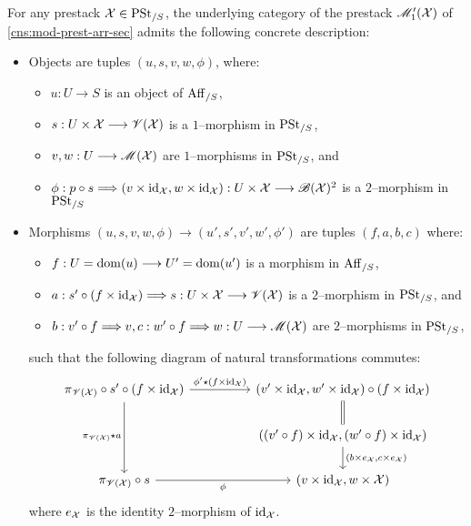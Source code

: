 \documentclass[11pt]{amsart}
\begin{document}
\begin{prop}\label{prop:M1'-concrete}
For any prestack $\mathcal{X} \in \mathrm{PSt}_{/S}$, the underlying category
of the prestack $\mathscr{M}_1'(\mathcal{X})$ of \cref{cns:mod-prest-arr-sec} admits the
following concrete description:
\begin{itemize}
\item Objects are tuples $(u, s, v, w, \phi)$, where:
  \begin{itemize}
  \item $u : U \to S$ is an object of $\mathrm{Aff}_{/S}$,
  \item $s : U \times \mcX \to \sV(\mcX)$ is a $1$--morphism in $\mathrm{PSt}_{/S}$,
  \item $v, w : U \to \sM(\mcX)$ are $1$--morphisms in $\mathrm{PSt}_{/S}$, and
  \item $\phi : p \circ s \To (v \times \id_\mcX, w \times \id_\mcX) :
    U \times \mcX \to \sB(\mcX)^2$ is a $2$--morphism in $\mathrm{PSt}_{/S}$
  \end{itemize}
\item Morphisms $(u, s, v, w, \phi) \to (u', s', v', w', \phi')$ are tuples
  $(f, a, b, c)$ where:
  \begin{itemize}
  \item $f : U = \dom(u) \to U' = \dom(u')$ is a morphism in $\mathrm{Aff}_{/S}$,
  \item $a : s' \circ (f \times \id_\mcX) \To s : U \times \mcX \to \sV(\mcX)$
    is a $2$--morphism in $\mathrm{PSt}_{/S}$, and
  \item $b : v' \circ f \To v, c : w' \circ f \To w : U \to \sM(\mcX)$
    are $2$--morphisms in $\mathrm{PSt}_{/S}$,
  \end{itemize}
  such that the following diagram of natural transformations commutes:
  \[\begin{tikzcd}[column sep=huge]
  \pi_{\sV(\mcX)} \circ s' \circ (f \times \id_\mcX)
    \ar[r, "\phi' \star (f \times \id_\mcX)"]
    \ar[dd, "\pi_{\sV(\mcX)} \star a" left] &
  (v' \times \id_\mcX, w' \times \id_\mcX) \circ (f \times \id_\mcX)
    \ar[d, equal] \\ &
  ((v' \circ f) \times \id_\mcX, (w' \circ f) \times \id_\mcX)
    \ar[d, "{(b \times e_\mcX, c \times e_\mcX)}"] \\
  \pi_{\sV(\mcX)} \circ s \ar[r, "\phi" below] &
  (v \times \id_\mcX, w \times \mcX)
  \end{tikzcd}\]
  where $e_\mathcal{X}$ is the identity $2$--morphism of $\mathrm{id}_\mathcal{X}$.
\end{itemize}
\end{prop}
\end{document}
